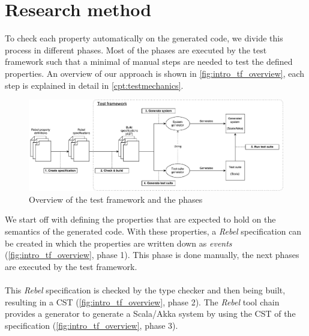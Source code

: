 \section{Research method}
To check each property automatically on the generated code, we divide this
process in different phases. Most of the phases are executed by the test
framework such that a minimal of manual steps are needed to test the defined
properties. An overview of our approach is shown in
\autoref{fig:intro_tf_overview}, each step is explained in detail in
\autoref{cpt:testmechanics}.
\begin{figure}[!ht]
	\includegraphics[width=\linewidth]{figures/testmechanics_overview}
\caption{Overview of the test framework and the phases}
\label{fig:intro_tf_overview}
\centering
\end{figure}
\FloatBarrier\noindent
%
We start off with defining the properties that are expected to hold on the
semantics of the generated code. With these properties, a \textit{Rebel}
specification can be created in which the properties are written down as
\textit{events} (\autoref{fig:intro_tf_overview}, phase 1). This phase is done
manually, the next phases are executed by the test framework.\\
\\
This \textit{Rebel} specification is checked by the type checker and then being
built, resulting in a CST (\autoref{fig:intro_tf_overview}, phase 2). The
\textit{Rebel} tool chain provides a generator to generate a Scala/Akka system
by using the CST of the specification (\autoref{fig:intro_tf_overview}, phase 3).
